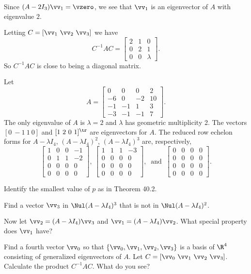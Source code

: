 	\item Since $(A - 2I_3) \vv_1 = \vzero$, we see that $\vv_1$ is an eigenvector of $A$ with eigenvalue $2$. 
	
	\item  Letting $C = [\vv_1 \ \vv_2 \ \vv_3]$ we have 
\[C^{-1}AC = \left[ \begin{array}{ccc} 2&1&0 \\ 0&2&1 \\ 0&0& \lambda \end{array} \right].\]
So $C^{-1}AC$ is close to being a diagonal matrix. 

	\ea

\begin{activity} \label{act:JCF_3} Let 
\[A = \left[ \begin{array}{rrrc} 0&0&0&2 \\ -6&0&-2&10 \\ -1&-1&1&3 \\ -3&-1&-1&7 \end{array} \right].\]
The only eigenvalue of $A$ is $\lambda = 2$ and $\lambda$ has geometric multiplicity 2. The vectors $[0 \ -1 \ 1 \ 0]$ and $[1 \ 2\ 0 \  1]^{\tr}$ are eigenvectors for $A$. The reduced row echelon forms for $A - \lambda I_4$,  $(A - \lambda I_4)^2$, $(A - \lambda I_4)^3$ are, respectively, 
\[\left[ \begin{array}{cccr} 1&0&0&-1 \\ 0&1&1&-2 \\ 0&0&0&0 \\ 0&0&0&0 \end{array} \right], \ \left[ \begin{array}{cccr} 1&1&1&-3 \\ 0&0&0&0 \\ 0&0&0&0 \\ 0&0&0&0 \end{array} \right], \ \text{ and } \ \left[ \begin{array}{cccc} 0&0&0&0 \\ 0&0&0&0 \\ 0&0&0&0 \\ 0&0&0&0 \end{array} \right].\]
	\ba
	\item Identify the smallest value of $p$ as in Theorem 40.2.%
	
	\item Find a vector $\vv_3$ in $\Nul (A - \lambda I_4)^3$ that is not in $\Nul (A - \lambda I_4)^2$.	

	\item Now let $\vv_2 = (A-\lambda I_4) \vv_3$ and $\vv_1 = (A-\lambda I_4) \vv_2$. What special property does $\vv_1$ have?
	
	\item Find a fourth vector $\vv_0$ so that $\{\vv_0, \vv_1, \vv_2, \vv_3\}$ is a basis of $\R^4$ consisting of generalized eigenvectors of $A$. Let $C = [\vv_0 \ \vv_1 \ \vv_2 \ \vv_3]$. Calculate the product $C^{-1}AC$. What do you see?  

	\ea
	
\end{activity}

